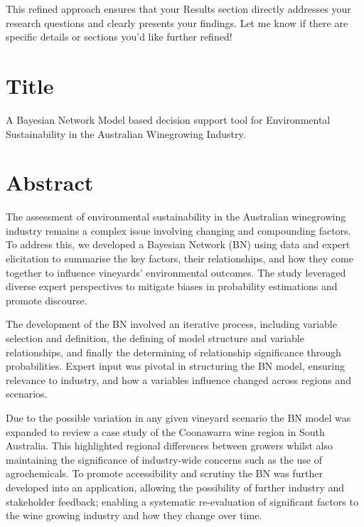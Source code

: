 This refined approach ensures that your Results section directly addresses your research questions and clearly presents your findings. Let me know if there are specific details or sections you’d like further refined!

\section{Title}
A Bayesian Network Model based decision support tool for Environmental Sustainability in the Australian Winegrowing Industry.

\section{Abstract}

The assessment of environmental sustainability in the Australian winegrowing industry remains a complex issue involving changing and compounding factors. To address this, we developed a Bayesian Network (BN) using data and expert elicitation to summarise the key factors, their relationships, and how they come together to influence vineyards' environmental outcomes. The study leveraged diverse expert perspectives to mitigate biases in probability estimations and promote discourse.

The development of the BN involved an iterative process, including variable selection and definition, the defining of model structure and variable relationships, and finally the determining of relationship significance through probabilities. Expert input was pivotal in structuring the BN model, ensuring relevance to industry, and how a variables influence changed across regions and scenarios.

Due to the possible variation in any given vineyard scenario the BN model was expanded to review a case study of the Coonawarra wine region in South Australia. This highlighted regional differences between growers whilst also maintaining the significance of industry-wide concerns such as the use of agrochemicals. To promote accessibility and scrutiny the BN was further developed into an application, allowing the possibility of further industry and stakeholder feedback; enabling a systematic re-evaluation of significant factors to the wine growing industry and how they change over time.

